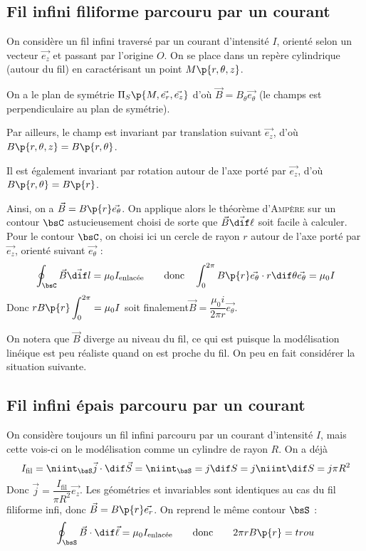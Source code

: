     \subsection{Fil infini filiforme parcouru par un courant}
    
    On considère un fil infini traversé par un courant d'intensité $I$, orienté selon un vecteur $\vec{e_z}$ et passant par l'origine $O$. On se place dans un repère cylindrique (autour du fil) en caractérisant un point $M\p{r, \theta, z}$.
    \begin{enumerate}
        \itt On a le plan de symétrie $\Pi_S \p{M, \vec{e_r}, \vec{e_z}}$ d'où $\vec B = B_\theta \vec{e_\theta}$ (le champs est perpendiculaire au plan de symétrie).
    
        \itt Par ailleurs, le champ est invariant par translation suivant $\vec{e_z}$, d'où $B\p{r, \theta, z} = B\p{r, \theta}$.
        
        \itt Il est également invariant par rotation autour de l'axe porté par $\vec{e_z}$, d'où $B\p{r, \theta} = B\p{r}$.
    \end{enumerate}
    Ainsi, on a $\vec B = B\p{r} \vec{e_\theta}$. On applique alors le théorème d'\textsc{Ampère} sur un contour $\bsC$ astucieusement choisi de sorte que $\vec B \vec{\dif \ell}$ soit facile à calculer. Pour le contour $\bsC$, on choisi ici un cercle de rayon $r$ autour de l'axe porté par $\vec{e_z}$, orienté suivant $\vec{e_\theta}$ :
    \[ \oint_\bsC \vec B \vec{\dif l}= \mu_0 I_\text{enlacée} \qquad\text{donc}\quad \int_0^{2\pi} B\p{r}\vec{e_\theta} \cdot r\dif \theta\vec{e_\theta} = \mu_0I\]
    Donc $r B\p{r} \displaystyle\int_0^{2\pi} = \mu_0 I$ soit finalement\qquad $\boxed{\vec{B} = \dfrac{\mu_0 i}{2\pi r}\vec{e_\theta}}$.
    
    On notera que $\vec{B}$ diverge au niveau du fil, ce qui est  puisque la modélisation linéique est peu réaliste quand on est proche du fil. On peu en fait considérer la situation suivante.
    
    \subsection{Fil infini épais parcouru par un courant}
    
    On considère toujours un fil infini parcouru par un courant d'intensité $I$, mais cette vois-ci on le modélisation comme un cylindre de rayon $R$. On a déjà
    \[ I_\text{fil} = \niint_\bsS \vec j \cdot \dif \vec S = \niint_\bsS = j \dif S = j \niint \dif S = j\pi R^2 \]
    Donc $\vec j = \dfrac{I_\text{fil}}{\pi R^2}\vec{e_z}$. Les géométries et invariables sont identiques au cas du fil filiforme infi, donc $\vec B = B\p{r}\vec{e_r}$. On reprend le même contour $\bsS$ :
    \[ \oint_\bsS \vec B \cdot \dif \vec \ell = \mu_0 I_\text{enlacée} \qquad\text{donc}\qquad 2\pi r B\p{r} = trou \]
    
